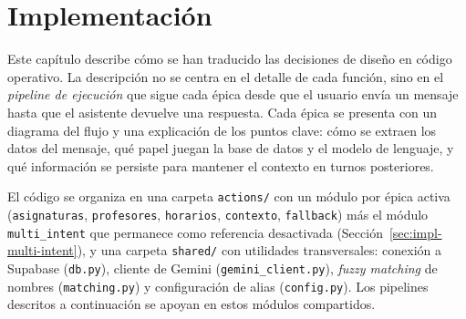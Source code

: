 
\chapter{Implementación}\label{cap:implementacion}

Este capítulo describe cómo se han traducido las decisiones de diseño en código operativo. La descripción no se centra en el detalle de cada función, sino en el \textit{pipeline de ejecución} que sigue cada épica desde que el usuario envía un mensaje hasta que el asistente devuelve una respuesta. Cada épica se presenta con un diagrama del flujo y una explicación de los puntos clave: cómo se extraen los datos del mensaje, qué papel juegan la base de datos y el modelo de lenguaje, y qué información se persiste para mantener el contexto en turnos posteriores.

El código se organiza en una carpeta \texttt{actions/} con un módulo por épica activa (\texttt{asignaturas}, \texttt{profesores}, \texttt{horarios}, \texttt{contexto}, \texttt{fallback}) más el módulo \texttt{multi\_intent} que permanece como referencia desactivada (Sección~\ref{sec:impl-multi-intent}), y una carpeta \texttt{shared/} con utilidades transversales: conexión a Supabase (\texttt{db.py}), cliente de Gemini (\texttt{gemini\_client.py}), \textit{fuzzy matching} de nombres (\texttt{matching.py}) y configuración de alias (\texttt{config.py}). Los pipelines descritos a continuación se apoyan en estos módulos compartidos.



